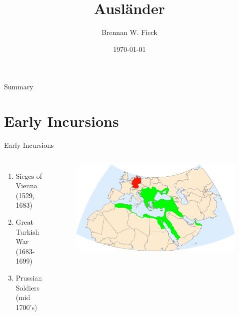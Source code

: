 \documentclass{beamer}
\title[Turks in Germany]{Ausl{\"a}nder}
\date{\today}
\author{Brennan W. Fieck}
\institute{LAIS 418 - Narrating the Notion}
\begin{document}
\frame{\titlepage}
\section{}
\begin{frame}{Summary}
	\tableofcontents
\end{frame}

\section{Early Incursions}
\begin{frame}{Early Incursions}
	\begin{columns}
			\begin{enumerate}
				\item Sieges of Vienna (1529, 1683)
				\item Great Turkish War (1683-1699)
				\item Prussian Soldiers (mid 1700's)
			\end{enumerate}
			\vcenter
			\begin{figure}[ht]
				\centering
				\includegraphics[width=1.4\textwidth]{1683OttomanEmpire.png}
			\end{figure}
			
	\end{columns}
\end{frame}
\end{document}
